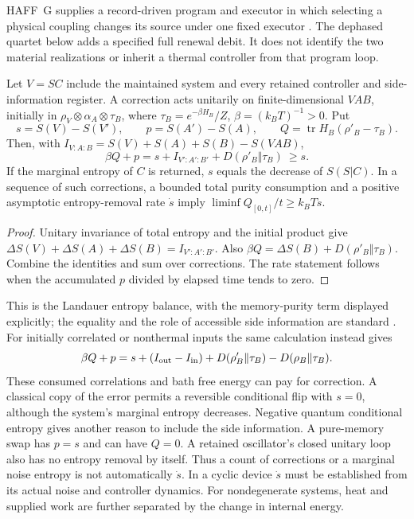 HAFF~G supplies a record-driven program and executor in which selecting
a physical coupling changes its source under one fixed executor
\cite{Liu2026PaperG}. The dephased quartet below adds a specified full
renewal debit. It does not identify the two material realizations or
inherit a thermal controller from that program loop.

\begin{proposition}\label{prop:entropyaccount}
Let $V=SC$ include the maintained system and every retained controller and
side-information register. A correction acts unitarily on finite-dimensional
$VAB$, initially in $\rho_V\otimes\alpha_A\otimes\tau_B$, where
$\tau_B=e^{-\beta H_B}/Z$, $\beta=(k_BT)^{-1}>0$. Put
\[
 s=S(V)-S(V'),\qquad p=S(A')-S(A),\qquad
 Q=\operatorname{tr}H_B(\rho'_B-\tau_B).
\]
Then, with $I_{V:A:B}=S(V)+S(A)+S(B)-S(VAB)$,
\begin{equation}
 \beta Q+p=s+I_{V':A':B'}+D(\rho'_B\Vert\tau_B)\ \ge s.
 \label{eq:entropyaccount}
\end{equation}
If the marginal entropy of $C$ is returned, $s$ equals the decrease of
$S(S|C)$. In a sequence of such corrections, a bounded total purity consumption
and a positive asymptotic entropy-removal rate $\dot s$ imply
$\liminf Q_{[0,t]}/t\ge k_BT\dot s$.
\end{proposition}
\begin{proof}
Unitary invariance of total entropy and the initial product give
$\Delta S(V)+\Delta S(A)+\Delta S(B)=I_{V':A':B'}$.
Also $\beta Q=\Delta S(B)+D(\rho'_B\Vert\tau_B)$.
Combine the identities and sum over corrections. The rate statement follows when
the accumulated $p$ divided by elapsed time tends to zero.
\end{proof}

This is the Landauer entropy balance, with the memory-purity term displayed
explicitly; the equality and the role of accessible side information are standard
\cite[Theorem~3 and Section~5.1]{ReebWolf2014}. For initially correlated or
nonthermal inputs the same calculation instead gives
\[
 \beta Q+p=s+(I_{\rm out}-I_{\rm in})+
 D(\rho'_B\Vert\tau_B)-D(\rho_B\Vert\tau_B).
\]
These consumed correlations and bath free energy can pay for correction. A classical
copy of the error permits a reversible conditional flip with $s=0$, although the
system's marginal entropy decreases. Negative quantum conditional entropy gives
another reason to include the side information. A pure-memory swap has $p=s$ and
can have $Q=0$. A retained oscillator's closed unitary loop also has no entropy
removal by itself. Thus a count of corrections or a marginal noise entropy is not
automatically $\dot s$. In a cyclic device $\dot s$ must be established from its
actual noise and controller dynamics. For nondegenerate systems, heat and supplied
work are further separated by the change in internal energy.

